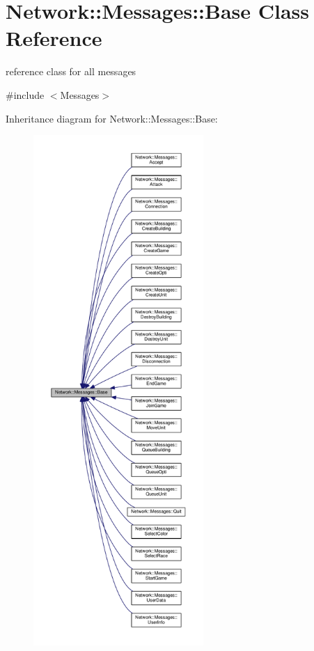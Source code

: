 \hypertarget{class_network_1_1_messages_1_1_base}{}\section{Network\+:\+:Messages\+:\+:Base Class Reference}
\label{class_network_1_1_messages_1_1_base}


reference class for all messages  




{\ttfamily \#include $<$Messages$>$}



Inheritance diagram for Network\+:\+:Messages\+:\+:Base\+:
\nopagebreak
\begin{figure}[H]
\begin{center}
\leavevmode
\includegraphics[height=550pt]{class_network_1_1_messages_1_1_base__inherit__graph}
\end{center}
\end{figure}
